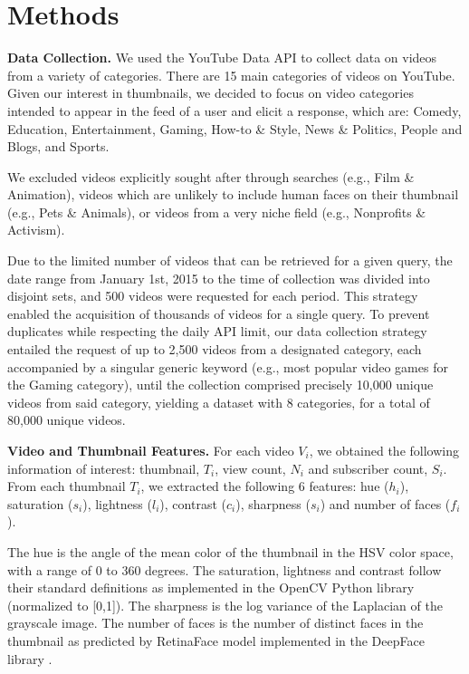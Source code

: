 \documentclass{article}
\begin{document}
\section{Methods}
\textbf{Data Collection.} We used the YouTube Data API \cite{youtubeapi} to collect data on videos from a variety of categories. There are 15 main categories of videos on YouTube. Given our interest in thumbnails, we decided to focus on video categories intended to appear in the feed of a user and elicit a response, which are: Comedy, Education, Entertainment, Gaming, How-to \& Style, News \& Politics, People and Blogs, and Sports.

We excluded videos explicitly sought after through searches (e.g., Film \& Animation), videos which are unlikely to include human faces on their thumbnail (e.g., Pets \& Animals), or videos from a very niche field (e.g., Nonprofits \& Activism).

Due to the limited number of videos that can be retrieved for a given query, the date range from January 1st, 2015 to the time of collection was divided into disjoint sets, and 500 videos were requested for each period. This strategy enabled the acquisition of thousands of videos for a single query. To prevent duplicates while respecting the daily API limit, our data collection strategy entailed the request of up to 2,500 videos from a designated category, each accompanied by a singular generic keyword (e.g., most popular video games for the Gaming category), until the collection comprised precisely 10,000 unique videos from said category, yielding a dataset with 8 categories, for a total of 80,000 unique videos.



\textbf{Video and Thumbnail Features.} For each video $V_i$, we obtained the following information of interest: thumbnail, $T_i$, view count, $N_i$ and subscriber count, $S_i$. From each thumbnail $T_{i}$, we extracted the following 6 features: hue ($h_{i}$), saturation ($s_{i}$), lightness ($l_{i}$), contrast ($c_{i}$), sharpness ($s_{i}$) and number of faces ($f_{i}$).

The hue is the angle of the mean color of the thumbnail in the HSV color space, with a range of 0 to 360 degrees. The saturation, lightness and contrast follow their standard definitions as implemented in the OpenCV Python library (normalized to [0,1]). The sharpness is the log variance of the Laplacian of the grayscale image. The number of faces is the number of distinct faces in the thumbnail as predicted by RetinaFace model implemented in the DeepFace library \cite{serengil2024lightface,serengil2020lightface}.
\end{document}
